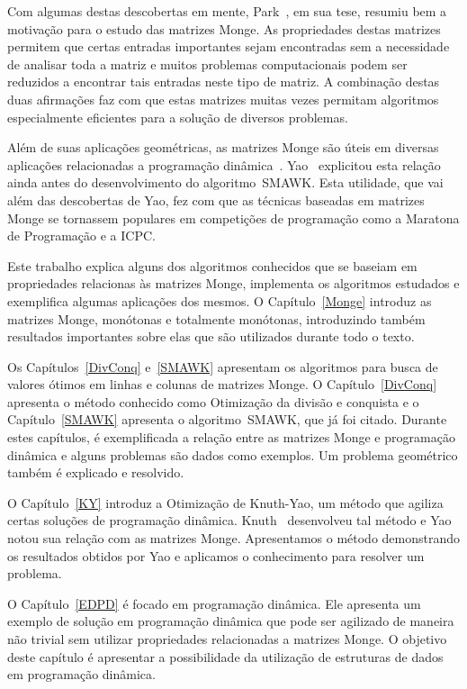 Com algumas destas descobertas em mente, Park~\cite{Park:1991}, em sua tese, resumiu bem a motivação para o estudo das matrizes Monge. As propriedades destas matrizes permitem que certas entradas importantes sejam encontradas sem a necessidade de analisar toda a matriz e muitos problemas computacionais podem ser reduzidos a encontrar tais entradas neste tipo de matriz. A combinação destas duas afirmações faz com que estas matrizes muitas vezes permitam algoritmos especialmente eficientes para a solução de diversos problemas.

Além de suas aplicações geométricas, as matrizes Monge são úteis em diversas aplicações relacionadas a programação dinâmica~\cite{Bein:2009,Burkard:1996,Galil:1992}. Yao~\cite{Yao:1980,Yao:1982} explicitou esta relação ainda antes do desenvolvimento do algoritmo~\textsc{SMAWK}. Esta utilidade, que vai além das descobertas de Yao, fez com que as técnicas baseadas em matrizes Monge se tornassem populares em competições de programação como a Maratona de Programação e a ICPC.

Este trabalho explica alguns dos algoritmos conhecidos que se baseiam em propriedades relacionas às matrizes Monge, implementa os algoritmos estudados e exemplifica algumas aplicações dos mesmos. O Capítulo~\ref{Monge} introduz as matrizes Monge, monótonas e totalmente monótonas, introduzindo também resultados importantes sobre elas que são utilizados durante todo o texto. 

Os Capítulos~\ref{DivConq} e~\ref{SMAWK} apresentam os algoritmos para busca de valores ótimos em linhas e colunas de matrizes Monge. O Capítulo~\ref{DivConq} apresenta o método conhecido como Otimização da divisão e conquista e o Capítulo~\ref{SMAWK} apresenta o algoritmo~\textsc{SMAWK}, que já foi citado. Durante estes capítulos, é exemplificada a relação entre as matrizes Monge e programação dinâmica e alguns problemas são dados como exemplos. Um problema geométrico também é explicado e resolvido.

O Capítulo~\ref{KY} introduz a Otimização de Knuth-Yao, um método que agiliza certas soluções de programação dinâmica. Knuth~\cite{Knuth:1971} desenvolveu tal método e Yao~\cite{Yao:1980,Yao:1982} notou sua relação com as matrizes Monge. Apresentamos o método demonstrando os resultados obtidos por Yao e aplicamos o conhecimento para resolver um problema.

O Capítulo~\ref{EDPD} é focado em programação dinâmica. Ele apresenta um exemplo de solução em programação dinâmica que pode ser agilizado de maneira não trivial sem utilizar propriedades relacionadas a matrizes Monge. O objetivo deste capítulo é apresentar a possibilidade da utilização de estruturas de dados em programação dinâmica. 

